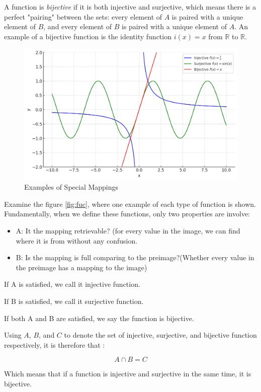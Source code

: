 \documentclass[
	12pt, %
	fleqn, %
	a4paper, %
]{LegrandOrangeBook}
\begin{document}
\begin{definition}
    A function is \emph{bijective} if it is both injective and surjective, which means there is a perfect "pairing" between the sets: every element of \( A \) is paired with a unique element of \( B \), and every element of \( B \) is paired with a unique element of \( A \). An example of a bijective function is the identity function \( i(x) = x \) from \( \mathbb{R} \) to \( \mathbb{R} \).
\end{definition}

\begin{figure}[H]
    \centering
    \includegraphics[width=0.75\linewidth]{Images/func.jpg}
    \caption{Examples of Special Mappings}
    \label{fig:fuc}
\end{figure}

Examine the figure \autoref{fig:fuc}, where one example of each type of function is shown. Fundamentally, when we define these functions, only two properties are involve:
\begin{itemize}
    \item A: It the mapping retrievable? (for every value in the image, we can find where it is from without any confusion.
    \item B: Is the mapping is full comparing to the preimage?(Whether every value in the preimage has a mapping to the image)
\end{itemize}
If A is satisfied, we call it injective function.

If B is satisfied, we call it surjective function.

If both A and B are satisfied, we say the function is bijective.

Using $A$, $B$, and $C$ to denote the set of injective, surjective, and bijective function respectively, it is therefore that :

    $$A\cap B = C$$

Which means that if a function is injective and surjective in the same time, it is bijective. 
\end{document}
